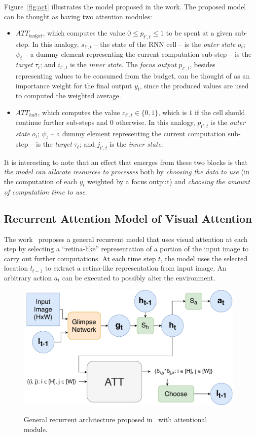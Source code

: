 \documentclass[11pt]{article}
\begin{document}
Figure~\ref{fig:act} illustrates the model proposed in the work.
The proposed model can be thought as having two attention modules:
\begin{itemize}
    \item \textbf{$ATT_{budget}$}, which computes the value $0 \le p_{t',t} \le 1$ to be spent at a given sub-step.
        In this analogy, $s_{t',t}$ -- the state of the RNN cell -- is the \emph{outer state} $o_t$;
        $\psi_t$ -- a dummy element representing the current computation sub-step -- is the \emph{target} $\tau_t$;
        and $i_{t',t}$ is the \emph{inner state}.
        The \emph{focus output} $p_{t',t}$, besides representing values to be consumed from the budget,
        can be thought of as an importance weight for the final output $y_t$, since the produced values are used to computed
        the weighted average.
    \item \textbf{$ATT_{halt}$}, which computes the value $c_{t',t} \in \{0, 1\}$, which is $1$ if the cell should continue
        further sub-steps and $0$ otherwise.
        In this analogy, $p_{t',t}$ is the \emph{outer state} $o_t$;
        $\psi_t$ -- a dummy element representing the current computation sub-step -- is the \emph{target} $\tau_t$;
        and $j_{t',t}$ is the \emph{inner state}.
\end{itemize}

It is interesting to note that an effect that emerges from these two blocks is that
\emph{the model can allocate resources to processes} both by
\emph{choosing the data to use} (in the computation of each $y_t$ weighted by a focus output)
and \emph{choosing the amount of computation time to use}.

\subsection{Recurrent Attention Model of Visual Attention}
The work~\cite{ref:ram} proposes a general recurrent model that uses visual attention at each step
by selecting a ``retina-like'' representation of a portion of the input image to carry out further computations.
At each time step $t$, the model uses the selected location $l_{t-1}$ to extract a retina-like representation
from input image.
An arbitrary action $a_t$ can be executed to possibly alter the environment.

\begin{figure}[H]
    \centering
    \includegraphics[width=0.7\linewidth]{./img/ram.pdf}
    \label{fig:ram}
    \caption{General recurrent architecture proposed in~\cite{ref:ram} with attentional module.}
\end{figure}
\end{document}
